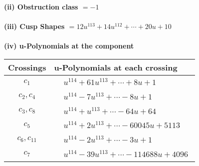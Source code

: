 \documentclass[1p]{elsarticle_modified}
\theoremstyle{definition}
\begin{document}
\flushleft \textbf{(ii) Obstruction class $= -1$}\\~\\
\flushleft \textbf{(iii) Cusp Shapes $= 12 u^{113}+14 u^{112}+\cdots+20 u+10$}\\~\\
\newpage\renewcommand{\arraystretch}{1}
\flushleft \textbf{(iv) u-Polynomials at the component}\newline \\
\begin{tabular}{m{50pt}|m{274pt}}
Crossings & \hspace{64pt}u-Polynomials at each crossing \\
\hline $$\begin{aligned}c_{1}\end{aligned}$$&$\begin{aligned}
&u^{114}+61 u^{113}+\cdots+8 u+1
\end{aligned}$\\
\hline $$\begin{aligned}c_{2},c_{4}\end{aligned}$$&$\begin{aligned}
&u^{114}-7 u^{113}+\cdots-8 u+1
\end{aligned}$\\
\hline $$\begin{aligned}c_{3},c_{8}\end{aligned}$$&$\begin{aligned}
&u^{114}+u^{113}+\cdots-64 u+64
\end{aligned}$\\
\hline $$\begin{aligned}c_{5}\end{aligned}$$&$\begin{aligned}
&u^{114}+2 u^{113}+\cdots-60045 u+5113
\end{aligned}$\\
\hline $$\begin{aligned}c_{6},c_{11}\end{aligned}$$&$\begin{aligned}
&u^{114}-2 u^{113}+\cdots-3 u+1
\end{aligned}$\\
\hline $$\begin{aligned}c_{7}\end{aligned}$$&$\begin{aligned}
&u^{114}-39 u^{113}+\cdots-114688 u+4096
\end{aligned}$\\

\end{tabular}
\end{document}
